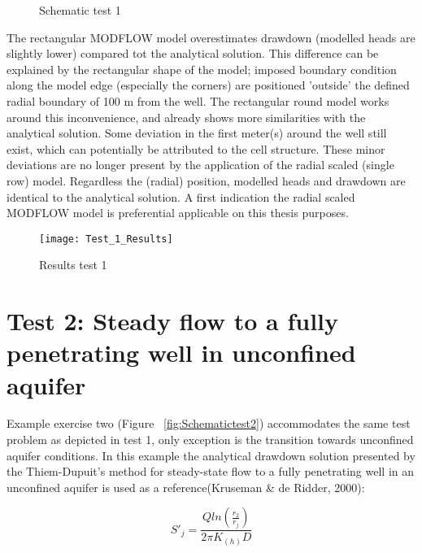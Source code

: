 \begin{figure}[h]
\centering
{}
\captionsetup{justification=centering}
\caption{Schematic test 1}
\label{fig:Schematictest1}
\end{figure}

The rectangular MODFLOW model overestimates drawdown (modelled heads are slightly lower) compared tot the analytical solution. This difference can be explained by the rectangular shape of the model; imposed boundary condition along the model edge (especially the corners) are positioned 'outside' the defined radial boundary of 100 m from the well. The rectangular round model works around this inconvenience, and already shows more similarities with the analytical solution. Some deviation in the first meter(s) around the well still exist, which can potentially be attributed to the cell structure. These minor deviations are no longer present by the application of the radial scaled (single row) model. Regardless the (radial) position, modelled heads and drawdown are identical to the analytical solution. A first indication the radial scaled MODFLOW model is preferential applicable on this thesis purposes.  

\begin{figure}[h!]
 \centering\texttt{[image: Test\_1\_Results]}
 \captionsetup{justification=centering}
 \caption{Results test 1}
 \label{fig:Test1_results}
\end{figure} 


\clearpage\section{Test 2: Steady flow to a fully penetrating well in unconfined aquifer}
Example exercise two (Figure ~\ref{fig:Schematictest2}) accommodates the same test problem as depicted in test 1, only exception is the transition towards unconfined aquifer conditions. In this example the analytical drawdown solution presented by the Thiem-Dupuit's method for steady-state flow to a fully penetrating well in an unconfined aquifer is used as a reference(Kruseman \& de Ridder, 2000):

\begin{equation}
 S'_j = \frac{Q ln(\frac{r_{2}}{r_{j}})}{2\pi K_{(h)}D}
 \label{eq:thiem_unconfined}
 \end{equation} 
 
